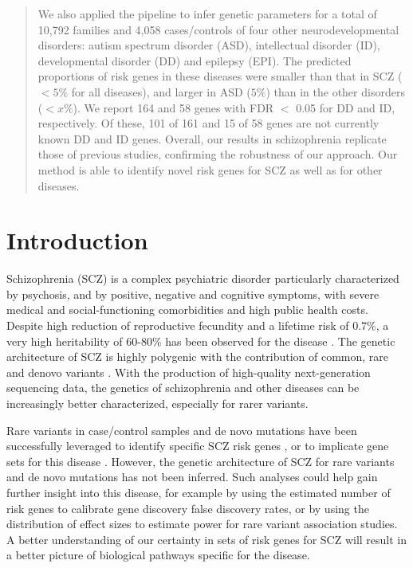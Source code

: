 \documentclass[]{article}
\begin{document}
\begin{abstract}
  We also applied the pipeline to infer genetic parameters for a total of 10,792 families and 4,058 cases/controls of four other neurodevelopmental disorders: autism spectrum disorder (ASD), intellectual disorder (ID), developmental disorder (DD) and epilepsy (EPI). The predicted proportions of risk genes in these diseases were smaller than that in SCZ ($< 5\%$ for all diseases), and larger in ASD ($5\%$) than in the other disorders ($< x\%$). We report 164 and 58 genes with FDR $<$ 0.05 for DD and ID, respectively. Of these, 101 of 161 and 15 of 58 genes are not currently known DD and ID genes.
  Overall, our results in schizophrenia replicate those of previous studies, confirming the robustness of our approach. Our method is able to identify novel risk genes for SCZ as well as for other diseases.

\end{abstract}

\tableofcontents

\section{Introduction}

Schizophrenia (SCZ) is a complex psychiatric disorder particularly characterized by psychosis, and
by positive, negative and cognitive symptoms, with severe medical and social-functioning
comorbidities and high public health costs. Despite high reduction of reproductive fecundity and a
lifetime risk of $0.7\%$, a very high heritability of 60-80$\%$ has been observed for the disease
\citep{lichtenstein2009common, sullivan2003schizophrenia}. The genetic architecture of SCZ is highly
polygenic with the contribution of common, rare and denovo variants \citep{purcell2014polygenic,
fromer2014novo, singh2016rare,  stefansson2009common,purcell2009common}. With the production of
high-quality next-generation sequencing data, the genetics of schizophrenia and other diseases can
be increasingly better characterized, especially for rarer variants.

Rare variants in case/control samples and de novo mutations have been successfully leveraged to
identify specific SCZ risk genes \citep{singh2016rare,takata2016novo}, or to implicate gene sets for
this disease \citep{purcell2014polygenic,fromer2014novo}. However, the genetic architecture of SCZ
for rare variants and de novo mutations has not been inferred. Such analyses could help gain further
insight into this disease, for example by using the estimated number of risk genes to calibrate gene
discovery false discovery rates, or by using the distribution of effect sizes to estimate power for
rare variant association studies. A better understanding of our certainty in sets of risk genes for
SCZ will result in a better picture of biological pathways specific for the disease.
\end{document}
